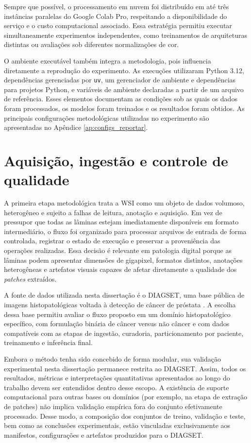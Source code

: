 Sempre que possível, o processamento em nuvem foi distribuído em até três instâncias paralelas do Google Colab Pro, respeitando a disponibilidade do serviço e o custo computacional associado. Essa estratégia permitiu executar simultaneamente experimentos independentes, como treinamentos de arquiteturas distintas ou avaliações sob diferentes normalizações de cor.

O ambiente executável também integra a metodologia, pois influencia diretamente
a reprodução do experimento. As execuções utilizaram Python 3.12, dependências
gerenciadas por \texttt{uv}, um gerenciador de ambiente e dependências para
projetos Python, e variáveis de ambiente declaradas a partir de um arquivo de
referência. Esses elementos documentam as condições sob as quais os dados foram
processados, os modelos foram treinados e os resultados foram obtidos. As
principais configurações metodológicas utilizadas no experimento são apresentadas
no Apêndice \ref{ap:configs_reportar}.


\section{Aquisição, ingestão e controle de qualidade}\label{sec:met_ingestao_qc}

A primeira etapa metodológica trata a WSI como um objeto de dados volumoso,
heterogêneo e sujeito a falhas de leitura, anotação e aquisição. Em vez de
pressupor que todas as lâminas estejam imediatamente disponíveis em formato
intermediário, o fluxo foi organizado para processar arquivos de entrada de
forma controlada, registrar o estado de execução e preservar a proveniência das
operações realizadas. Essa decisão é relevante em patologia digital porque as
lâminas podem apresentar dimensões de gigapixel, formatos distintos,
anotações heterogêneas e artefatos visuais capazes de afetar diretamente a
qualidade dos \textit{patches} extraídos.

A fonte de dados utilizada nesta dissertação é o DIAGSET, uma base pública de imagens histopatológicas voltada à detecção de câncer de próstata \cite{koziarski2024diagset}. A escolha dessa base permitiu avaliar o fluxo proposto em um domínio histopatológico específico, com formulação binária de câncer versus não câncer e com dados compatíveis com as etapas de ingestão, curadoria, particionamento por paciente, treinamento e inferência final.

Embora o método tenha sido concebido de forma modular, sua validação experimental nesta dissertação permanece restrita ao DIAGSET. Assim, todos os resultados, métricas e interpretações quantitativas apresentados ao longo do trabalho devem ser entendidos dentro desse escopo. A existência de suporte computacional para outras bases ou domínios (por exemplo, na etapa de extração de patches) não implica validação empírica fora do conjunto efetivamente processado. Desse modo, a composição dos conjuntos de treino, validação e teste, bem como as conclusões experimentais, estão vinculadas exclusivamente aos manifestos, configurações e artefatos produzidos para o DIAGSET.

